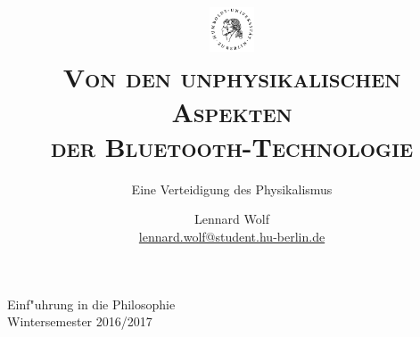 \documentclass[a4paper, emulatestandardclasses, 12pt]{scrartcl}
\date{\vspace{-3ex}}
\begin{document}
\title{%
	\includegraphics*[width=0.1\textwidth]{images/hu_logo2.png}\\
	\vspace{50pt}
	\scshape\LARGE{Von den unphysikalischen Aspekten\\der Bluetooth-Technologie}}
	
	\subtitle{Eine Verteidigung des Physikalismus}
\author{Lennard Wolf\\
        \small{\href{mailto:lennard.wolf@student.hu-berlin.de}{lennard.wolf@student.hu-berlin.de}}}      

\maketitle

\vspace{\fill}

\begin{minipage}[b]{\textwidth}
    \centering
    \onehalfspacing
    \large   
    Einf"uhrung in die Philosophie\\
    Wintersemester 2016/2017

    \vspace{-20mm} 
\end{minipage}%
\thispagestyle{empty}
\newpage
\clearpage
\setcounter{page}{1}
\end{document}
